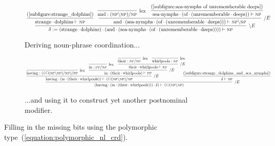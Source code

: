 \begin{figure}
	\begin{subfigure}{1\textwidth}
			\[
			\resizebox{1\textwidth}{!}{

				\infer[\divleft E]{\delta := (\w{strange}\sbind\w{dolphins})\sbind(\w{and}\sbind(\w{sea-nymphs}\sbind(\w{of}\sbind(\w{unrememberable}\sbind\w{deeps}))))\vdash \np}{
					\infer{\w{strange}\sbind\w{dolphins} \vdash \np}{\text{(\ref{subfigure:strange_dolphins})}}
					&
					\infer[\divright E]{\w{and}\sbind(\w{sea-nymphs}\sbind(\w{of}\sbind(\w{unrememberable}\sbind\w{deeps}))) \vdash \np\divleft\np}{
						\hspace{-2pt}
						\infer[\Lex]{\w{and}: (\np\divleft\np)\divright\np}{}
						&
						\infer{\w{sea-nymphs}\sbind(\w{of}\sbind(\w{unrememberable}\sbind\w{deeps}))\vdash \np}{\text{(\ref{subfigure:sea-nymphs of unrememberable deeps})}}
					}
				}
			}
			\]
			\caption{Deriving noun-phrase coordination...}
			\label{subfigure:strange_dolphins_and_sea_nymphs}
	\end{subfigure}
	\begin{subfigure}{1\textwidth}
		\[
		\resizebox{1\textwidth}{!}{
			\infer[\divright E]{(\w{having}\sbind(\w{in}\sbind(\w{their}\sbind\w{whirlpools})))\sbind\delta) \vdash \diamond\bx(\np\divleft\np)}{
				\infer[\divright E]{\w{having}\sbind(\w{in}\sbind(\w{their}\sbind\w{whirlpools})) \vdash \diamond\bx(\np\divleft\np)\divright\np}{
					\infer[\Lex]{\w{having}: (\diamond\bx(\np\divleft\np)\divright\np)\divright\pp}{}
					&
					\infer[\divright E]{\w{in}\sbind(\w{their}\sbind\w{whirlpools}) \vdash \pp}{
						\infer[\Lex]{\w{in}: \pp\divright\np}{}
						&
						\infer[\divright E]{\w{their}\sbind\w{whirlpools} \vdash \np}{
							\infer[\Lex]{\w{their}: \np\divright\np}{}
							&
							\infer[\Lex]{\w{whirlpools}: \np}{}
						}
					}
				}
				&
				\hspace{-15pt}
				\infer{\delta \vdash \np}{\text{(\ref{subfigure:strange_dolphins_and_sea_nymphs})}}
			}
		}
		\]
		\caption{...and using it to construct yet another postnominal modifier.}
		\label{subfigure:having_in_their_whirlpools}
	\end{subfigure}
	\caption{Filling in the missing bits using the polymorphic type~(\ref{equation:polymorphic_nl_crd}).}
	\label{figure:lovecraft_coord}
\end{figure}

